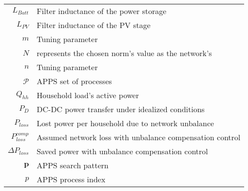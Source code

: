 \begin{scriptsize}
\begin{tabularx}{\textwidth}{r|X}
$L_{Batt}$															& Filter inductance of the power storage\\
$L_{PV}$															& Filter inductance of the PV stage\\
$m$                             & Tuning parameter\\
$N$											& represents the chosen norm's value as the network's\\
$n$                             & Tuning parameter\\
$\mathcal{P}$                   & APPS set of processes\\
$Q_{hh}$                       & Household load's active power\\
$P_D$                           & DC-DC power transfer under idealized conditions\\
$P_{loss}$                        & Lost power per household due to network unbalance\\
  $P^{comp}_{loss}$                 & Assumed network loss with unbalance compensation control\\
  $\Delta P_{loss}$                 & Saved power with unbalance compensation control\\
  $\textbf{p}$                  & APPS search pattern\\
$p$                             & APPS process index\\



\end{tabularx}
\end{scriptsize}
